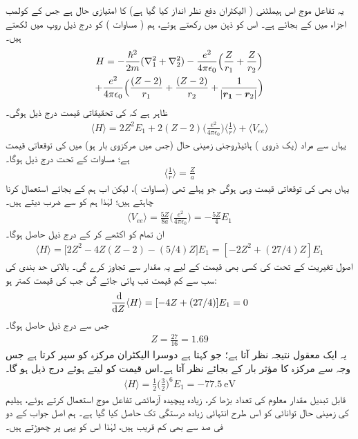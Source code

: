  
یہ تفاعل موج اس ہیملٹنی ( الیکٹران دفع نظر انداز کیا گیا ہے) کا امتیازی حال ہے جس کے کولمب اجزاء میں  کے بجائے  ہے۔ اس کو ذہن میں رکھتے ہوئے، ہم  ( مساوات ) کو درج ذیل روپ میں لکھتے ہیں۔
\begin{multline}
H=-\frac{\hslash^{2}}{2m}(\nabla_{1}^{2}+\nabla_{2}^{2})-\frac{e^{2}}{4\pi\epsilon_{0}}\Big(\frac{Z}{r_{1}}+\frac{Z}{r_{2}}\Big)\\
+\frac{e^{2}}{4\pi\epsilon_{0}}\Big(\frac{(Z-2)}{r_{1}}+\frac{(Z-2)}{r_{2}}+\frac{1}{\abs{{{\boldsymbol{r_{1}}}}-{{\boldsymbol{r}}}_{2}}}\Big)
\end{multline}
 ظاہر ہے کہ کی تحقیقاتی قیمت درج ذیل ہوگی۔
\begin{align}
\langle H \rangle = 2Z^{2}E_{1}+2(Z-2)\big(\frac{e^{2}}{4\pi\epsilon_{0}}\big)\big\langle \frac{1}{r}\big\rangle + \langle V_{ee} \rangle 
\end{align}
 یہاں  سے مراد (یک ذروی ) ہائیڈروجنی زمینی حال  (جس میں مرکزوی بار  ہو) میں  کی توقعاتی قیمت ہے؛ مساوات  کے تحت درج ذیل ہوگا۔
\begin{align}
\big\langle \frac{1}{r} \big\rangle = \frac{Z}{a} 
\end{align}
 یہاں بھی  کی توقعاتی قیمت وہی ہوگی جو پہلے تھی (مساوات )، لیکن اب ہم  کے بجائے   استعمال کرنا چاہتے ہیں؛ لہٰذا ہم  کو  سے ضرب دیتے ہیں۔ 
 \begin{align}
\langle V_{ee} \rangle =\frac{5Z}{8a}\big(\frac{e^{2}}{4\pi\epsilon_{0}}\big)=-\frac{5Z}{4}E_{1} 
\end{align}
 ان تمام کو اکٹھے کر کے درج ذیل حاصل ہوگا۔
 \begin{align}
\langle H \rangle =\big[2Z^{2}-4Z(Z-2)-(5/4)Z\big]E_{1}=[-2Z^{2}+(27/4)Z]E_{1} 
\end{align}
 اصول تغیریت کے تحت  کی کسی بھی قیمت کے لیے یہ مقدار  سے تجاوز کرے گی۔ بالائی حد بندی کی سب سے کم قیمت تب پائی جائے گی جب  کی قیمت کمتر ہو:
\begin{align*}
\frac{\dif}{\dif Z}\langle H \rangle =[-4Z+(27/4)]E_{1}=0
\end{align*}
 جس سے درج ذیل حاصل ہوگا۔
\begin{align}
Z=\frac{27}{16}=1.69
\end{align}
 یہ ایک معقول نتیجہ نظر آتا ہے؛ جو کہتا ہے دوسرا الیکٹران مرکزہ کو سپر کرتا ہے جس وجہ سے مرکزہ کا مؤثر بار  کے بجائے  نظر آتا ہے۔اس قیمت کو  لیتے ہوئے درج ذیل ہو گا۔
\begin{align}
\langle H \rangle =\frac{1}{2}\big(\frac{3}{2}\big)^{6}E_{1}=\SI{-77.5}{\electronvolt}
\end{align}
 قابل تبدیل مقدار معلوم کی تعداد بڑھا کر، زیادہ پیچیدہ آزمائشی تفاعل موج استعمال کرتے ہوئے، ہیلیم کی زمینی حال توانائی کو اس طرح انتہائی زیادہ درستگی تک حاصل کیا گیا ہے۔ ہم اصل جواب کے دو فی صد سے بھی کم قریب ہیں، لہٰذا اس کو یہی پر چھوڑتے ہیں۔
 
